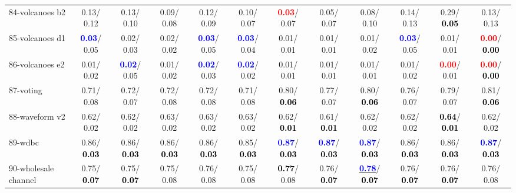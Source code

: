 \begin{table}[h]
\begin{center}
{\begin{tabular}{lc|c|c|c|c|c|c|c|c|c|c}
84-volcanoes b2 &   0.13/  0.12 &   0.13/  0.10 &   0.09/  0.08 &   0.12/  0.09 &   0.10/  0.07 & \textcolor{red}{\textbf{  0.03}}/  0.07 &   0.05/  0.07 &   0.08/  0.10 &   0.14/  0.13 &   0.29/\textcolor{black}{\textbf{  0.05}} &   0.13/  0.13 \\
85-volcanoes d1 & \textcolor{blue}{\textbf{  0.03}}/  0.05 &   0.02/  0.03 &   0.02/  0.02 & \textcolor{blue}{\textbf{  0.03}}/  0.05 & \textcolor{blue}{\textbf{  0.03}}/  0.04 &   0.01/  0.01 &   0.01/  0.01 &   0.01/  0.02 & \textcolor{blue}{\textbf{  0.03}}/  0.05 &   0.01/  0.01 & \textcolor{red}{\textbf{  0.00}}/\textcolor{black}{\textbf{  0.00}} \\ \hline
86-volcanoes e2 &   0.01/  0.02 & \textcolor{blue}{\textbf{  0.02}}/  0.05 &   0.01/  0.02 & \textcolor{blue}{\textbf{  0.02}}/  0.03 & \textcolor{blue}{\textbf{  0.02}}/  0.02 &   0.01/  0.01 &   0.01/  0.01 &   0.01/  0.01 &   0.01/  0.02 & \textcolor{red}{\textbf{  0.00}}/  0.01 & \textcolor{red}{\textbf{  0.00}}/\textcolor{black}{\textbf{  0.00}} \\
87-voting &   0.71/  0.08 &   0.72/  0.07 &   0.72/  0.08 &   0.72/  0.08 &   0.71/  0.08 &   0.80/\textcolor{black}{\textbf{  0.06}} &   0.77/  0.07 &   0.80/\textcolor{black}{\textbf{  0.06}} &   0.76/  0.07 &   0.79/  0.07 &   0.81/\textcolor{black}{\textbf{  0.06}} \\
88-waveform v2 &   0.62/  0.02 &   0.62/  0.02 &   0.63/  0.02 &   0.63/  0.02 &   0.63/  0.02 &   0.62/\textcolor{black}{\textbf{  0.01}} &   0.61/\textcolor{black}{\textbf{  0.01}} &   0.62/  0.02 &   0.62/  0.02 & \textcolor{black}{\textbf{  0.64}}/\textcolor{black}{\textbf{  0.01}} &   0.62/  0.02 \\
89-wdbc &   0.86/\textcolor{black}{\textbf{  0.03}} &   0.86/\textcolor{black}{\textbf{  0.03}} &   0.86/\textcolor{black}{\textbf{  0.03}} &   0.86/\textcolor{black}{\textbf{  0.03}} &   0.85/\textcolor{black}{\textbf{  0.03}} & \textcolor{blue}{\textbf{  0.87}}/\textcolor{black}{\textbf{  0.03}} & \textcolor{blue}{\textbf{  0.87}}/\textcolor{black}{\textbf{  0.03}} & \textcolor{blue}{\textbf{  0.87}}/\textcolor{black}{\textbf{  0.03}} &   0.86/\textcolor{black}{\textbf{  0.03}} &   0.86/\textcolor{black}{\textbf{  0.03}} & \textcolor{blue}{\textbf{  0.87}}/\textcolor{black}{\textbf{  0.03}} \\
90-wholesale channel &   0.75/\textcolor{black}{\textbf{  0.07}} &   0.75/\textcolor{black}{\textbf{  0.07}} &   0.75/  0.08 &   0.76/  0.08 &   0.75/  0.08 & \textcolor{black}{\textbf{  0.77}}/  0.08 &   0.76/\textcolor{black}{\textbf{  0.07}} & \underline{\textcolor{blue}{\textbf{  0.78}}}/\textcolor{black}{\textbf{  0.07}} &   0.76/\textcolor{black}{\textbf{  0.07}} &   0.76/\textcolor{black}{\textbf{  0.07}} &   0.76/  0.08 \\

\end{tabular}}
\end{center}
\end{table}
